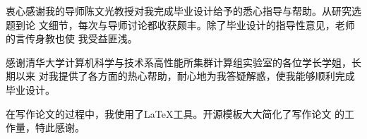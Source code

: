 \begin{ack}
衷心感谢我的导师陈文光教授对我完成毕业设计给予的悉心指导与帮助。从研究选题到论
文细节，每次与导师讨论都收获颇丰。除了毕业设计的指导性意见，老师的言传身教也使
我受益匪浅。

感谢清华大学计算机科学与技术系高性能所集群计算组实验室的各位学长学姐，长期以来
对我提供了各方面的热心帮助，耐心地为我答疑解惑，使我能够顺利完成毕业设计。

在写作论文的过程中，我使用了\LaTeX 工具。开源模板\thuthesis 大大简化了写作论文
的工作量，特此感谢。
\end{ack}
